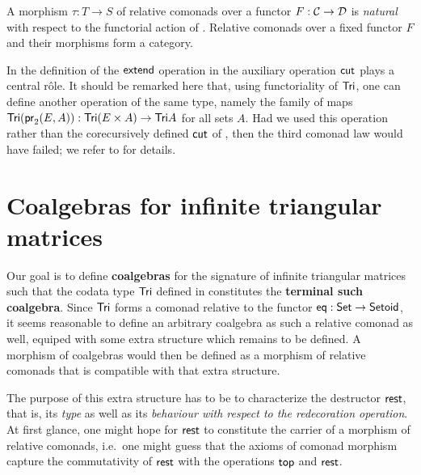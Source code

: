 \documentclass{amsart}
\newcommand{\fat}[1]{\textbf{#1}}
\begin{document}
A morphism $\tau : T\to S$ of relative comonads over a functor $F:{\mathcal{C}}\to\mathcal{D}$ is  \emph{natural}
with respect to the functorial action of .
% 
Relative comonads over a fixed functor $F$ and their morphisms form a category.

In the definition of the $\mathsf{extend}$ operation in  the auxiliary operation $\mathsf{cut}$ plays a central r\^ole.
It should be remarked here that, using functoriality of $\mathsf{Tri}$, one can define another operation of the same type, namely the family of 
maps $\mathsf{Tri}(\mathsf{pr}_2(E,A)) : \mathsf{Tri}(E\times A) \to \mathsf{Tri} A$ for
all sets $A$. Had we used this operation rather than the corecursively defined $\mathsf{cut}$ of , 
then the third comonad law would have failed; we refer to \parencite{DBLP:conf/types/MatthesS07} for details.


\section{Coalgebras for infinite triangular matrices}


Our goal is to define \fat{coalgebras} for the signature of infinite triangular matrices such that 
the codata type $\mathsf{Tri}$ defined in  constitutes the \fat{terminal such coalgebra}.
Since $\mathsf{Tri}$ forms a comonad relative to the functor $\mathsf{eq}:\mathsf{Set}\to\mathsf{Setoid}$, it seems reasonable to define
an arbitrary coalgebra as such a relative comonad as well, equiped with some extra structure which remains to be defined.
A morphism of coalgebras would then be defined as a morphism of relative comonads that is compatible with that extra structure.

The purpose of this extra structure has to be to characterize the destructor $\mathsf{rest}$, that is, its \emph{type} as well as
its \emph{behaviour with respect to the redecoration operation}.
At first glance, one might hope for $\mathsf{rest}$ to constitute the carrier of a morphism of relative comonads, i.e.\ one might 
guess that the axioms of comonad morphism capture the commutativity of $\mathsf{rest}$ with the operations $\mathsf{top}$ and $\mathsf{rest}$.
\end{document}

